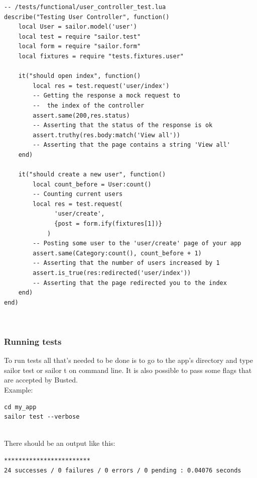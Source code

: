 \documentclass{article}
\begin{document}
\begin{lstlisting}[frame=single]
-- /tests/functional/user_controller_test.lua 
describe("Testing User Controller", function()
    local User = sailor.model('user')
    local test = require "sailor.test"
    local form = require "sailor.form"
    local fixtures = require "tests.fixtures.user"

    it("should open index", function()
        local res = test.request('user/index') 
        -- Getting the response a mock request to 
        --  the index of the controller
        assert.same(200,res.status)       
        -- Asserting that the status of the response is ok
        assert.truthy(res.body:match('View all'))  
        -- Asserting that the page contains a string 'View all'
    end)

    it("should create a new user", function()
        local count_before = User:count()    
        -- Counting current users
        local res = test.request(
        	  'user/create', 
        	  {post = form.ify(fixtures[1])}
        	) 
        -- Posting some user to the 'user/create' page of your app
        assert.same(Category:count(), count_before + 1)   
        -- Asserting that the number of users increased by 1
        assert.is_true(res:redirected('user/index'))  
        -- Asserting that the page redirected you to the index
    end)
end)
\end{lstlisting}\\

\subsubsection{Running tests}

To run tests all that's needed to be done is to go to the app's directory and type sailor test or sailor t on command line. It is also possible to pass some flags that are accepted by Busted.\\

Example:
\begin{lstlisting}[frame=single]
cd my_app
sailor test --verbose
\end{lstlisting}\\

There should be an output like this:
\begin{lstlisting}[frame=single]
************************
24 successes / 0 failures / 0 errors / 0 pending : 0.04076 seconds
\end{lstlisting}
\end{document}
